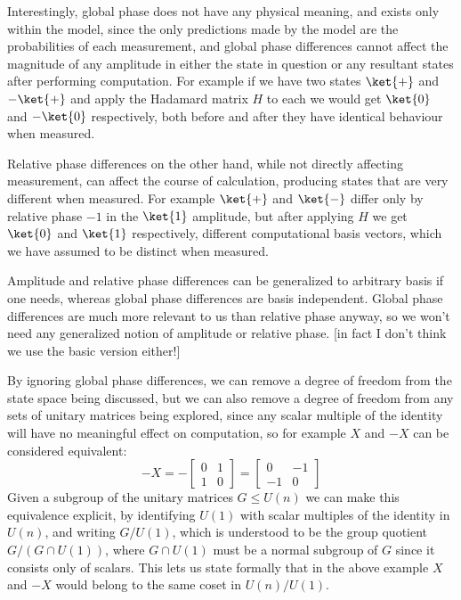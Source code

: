 Interestingly, global phase does not have any physical meaning, and exists only within the model, since the only predictions made by the model are the probabilities of each measurement, and global phase differences cannot affect the magnitude of any amplitude in either the state in question or any resultant states after performing computation. For example if we have two states $\ket{+}$ and $-\ket{+}$ and apply the Hadamard matrix $H$ to each we would get $\ket{0}$ and $-\ket{0}$ respectively, both before and after they have identical behaviour when measured.

Relative phase differences on the other hand, while not directly affecting measurement, can affect the course of calculation, producing states that are very different when measured. For example $\ket{+}$ and $\ket{-}$ differ only by relative phase $-1$ in the $\ket{1}$ amplitude, but after applying $H$ we get $\ket{0}$ and $\ket{1}$ respectively, different computational basis vectors, which we have assumed to be distinct when measured.

Amplitude and relative phase differences can be generalized to arbitrary basis if one needs, whereas global phase differences are basis independent. Global phase differences are much more relevant to us than relative phase anyway, so we won't need any generalized notion of amplitude or relative phase. [in fact I don't think we use the basic version either!]

By ignoring global phase differences, we can remove a degree of freedom from the state space being discussed, but we can also remove a degree of freedom from any sets of unitary matrices being explored, since any scalar multiple of the identity will have no meaningful effect on computation, so for example $X$ and $-X$ can be considered equivalent:
\[-X = -\left[\begin{matrix}0 & 1 \\ 1 & 0\end{matrix}\right]= \left[\begin{matrix}0 & -1 \\ -1 & 0\end{matrix}\right]\]
Given a subgroup of the unitary matrices $G \leq U(n)$ we can make this equivalence explicit, by identifying $U(1)$ with scalar multiples of the identity in $U(n)$, and writing $G/U(1)$, which is understood to be the group quotient $G/(G \cap U(1))$, where $G \cap U(1)$ must be a normal subgroup of $G$ since it consists only of scalars. This lets us state formally that in the above example $X$ and $-X$ would belong to the same coset in $U(n)/U(1)$.

